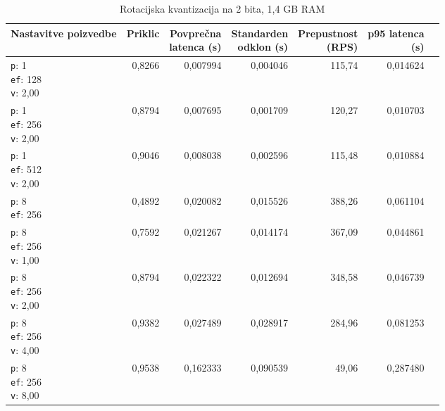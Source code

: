 \begin{table}[htbp]
  \centering
\small
  \caption{Rotacijska kvantizacija na 2 bita, 1,4 GB RAM}
  \label{tab:single-2cpu-1.4ram:tq2:qdrant-dipl-baseline-tenant-subgraph-tq2-ext-m16-ef-128-random-768-100-tenants-extended-upload-2026-08-18-22-46-16.json}
  \begin{tabularx}{\textwidth}{Xrrrrrr}
    \toprule
    Nastavitve poizvedbe & Priklic & \makecell{Povprečna\\latenca (s)} & \makecell{Standarden\\odklon (s)} & \makecell{Prepustnost\\(RPS)} & \makecell{p95 latenca\\(s)}  \\
    \midrule
    \makecell{\texttt{p}: 1\\\texttt{ef}: 128\\\texttt{v}: 2,00} & 0,8266 & 0,007994 & 0,004046 & 115,74 & 0,014624 \\
    \makecell{\texttt{p}: 1\\\texttt{ef}: 256\\\texttt{v}: 2,00} & 0,8794 & 0,007695 & 0,001709 & 120,27 & 0,010703 \\
    \makecell{\texttt{p}: 1\\\texttt{ef}: 512\\\texttt{v}: 2,00} & 0,9046 & 0,008038 & 0,002596 & 115,48 & 0,010884 \\
    \makecell{\texttt{p}: 8\\\texttt{ef}: 256} & 0,4892 & 0,020082 & 0,015526 & 388,26 & 0,061104 \\
    \makecell{\texttt{p}: 8\\\texttt{ef}: 256\\\texttt{v}: 1,00} & 0,7592 & 0,021267 & 0,014174 & 367,09 & 0,044861 \\
    \makecell{\texttt{p}: 8\\\texttt{ef}: 256\\\texttt{v}: 2,00} & 0,8794 & 0,022322 & 0,012694 & 348,58 & 0,046739 \\
    \makecell{\texttt{p}: 8\\\texttt{ef}: 256\\\texttt{v}: 4,00} & 0,9382 & 0,027489 & 0,028917 & 284,96 & 0,081253 \\
    \makecell{\texttt{p}: 8\\\texttt{ef}: 256\\\texttt{v}: 8,00} & 0,9538 & 0,162333 & 0,090539 & 49,06 & 0,287480 \\

\end{tabularx}
\end{table}

